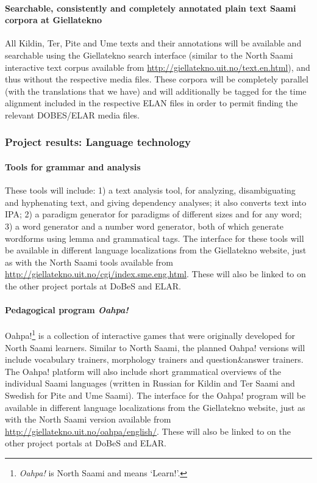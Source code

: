 \documentclass[a4paper,12pt]{article}
\begin{document}
\paragraph{Searchable, consistently and completely annotated plain text Saami corpora at Giellatekno}
All Kildin, Ter, Pite and Ume texts and their annotations will be available and searchable using the Giellatekno search interface (similar to the North Saami interactive text corpus available from \url{http://giellatekno.uit.no/text.en.html}), and thus without the respective media files. These corpora will be completely parallel (with the translations that we have) and will additionally be tagged for the time alignment included in the respective ELAN files in order to permit finding the relevant DOBES/ELAR media files.

\subsubsection{Project results: Language technology}\label{projectResult2}

\paragraph{Tools for grammar and analysis}
These tools will include: 1) a text analysis tool, for analyzing, disambiguating and hyphenating text, and giving dependency analyses; it also converts text into IPA; 2) a paradigm generator for paradigms of different sizes and for any word; 3) a word generator and a number word generator, both of which generate wordforms using lemma and grammatical tags. The interface for these tools will be available in different language localizations from the Giellatekno website, just as with the North Saami tools available from \url{http://giellatekno.uit.no/cgi/index.sme.eng.html}. These will also be linked to on the other project portals at DoBeS and ELAR.

\paragraph{Pedagogical program \textit{Oahpa!}}
Oahpa!\footnote{{\it Oahpa!} is North Saami and means ‘Learn!’.} is a collection of interactive games that were originally developed for North Saami learners. Similar to North Saami, the planned Oahpa! versions will include vocabulary trainers, morphology trainers and question\&answer trainers. The Oahpa! platform will also include short grammatical overviews of the individual Saami languages (written in Russian for Kildin and Ter Saami and Swedish for Pite and Ume Saami). The interface for the Oahpa! program will be available in different language localizations from the Giellatekno website, just as with the North Saami version available from \url{http://giellatekno.uit.no/oahpa/english/}. These will also be linked to on the other project portals at DoBeS and ELAR.
\end{document}
